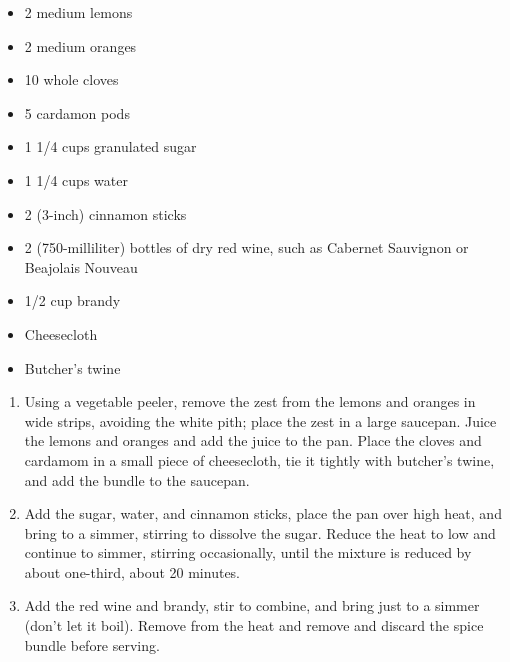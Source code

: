 \documentclass{article}
\begin{document}
\begin{framed}
\begin{itemize}
\item 2 medium lemons
\item 2 medium oranges
\item 10 whole cloves
\item 5 cardamon pods
\item 1 1/4 cups granulated sugar
\item 1 1/4 cups water
\item 2 (3-inch) cinnamon sticks
\item 2 (750-milliliter) bottles of dry red wine, such as Cabernet Sauvignon or Beajolais Nouveau
\item 1/2 cup brandy
\item Cheesecloth
\item Butcher's twine
\end{itemize}
\end{framed}

\begin{enumerate}
\item 
Using a vegetable peeler, remove the zest from the lemons and oranges in wide strips, avoiding the white pith; place the zest in a large saucepan. Juice the lemons and oranges and add the juice to the pan. Place the cloves and cardamom in a small piece of cheesecloth, tie it tightly with butcher’s twine, and add the bundle to the saucepan.
\item 
Add the sugar, water, and cinnamon sticks, place the pan over high heat, and bring to a simmer, stirring to dissolve the sugar. Reduce the heat to low and continue to simmer, stirring occasionally, until the mixture is reduced by about one-third, about 20 minutes.
\item 
Add the red wine and brandy, stir to combine, and bring just to a simmer (don’t let it boil). Remove from the heat and remove and discard the spice bundle before serving.
\end{enumerate}
\newpage
\end{document}
